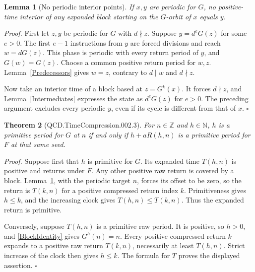 \documentclass[11pt,letterpaper]{article}
\newcommand{\N}{\mathbb{N}}
\newcommand{\Z}{\mathbb{Z}}
\newtheorem{theorem}{Theorem}
\newtheorem{lemma}[theorem]{Lemma}
\newenvironment{proof}{\noindent\textit{Proof.}}{\hfill\(\square\)}
\begin{document}
\begin{lemma}[No periodic interior points]\label{NoInterior}
If \(x,y\) are periodic for \(G\), no positive-time interior of any expanded
block starting on the \(G\)-orbit of \(x\) equals \(y\).
\end{lemma}
\begin{proof}
First let \(z,y\) be periodic for \(G\) with \(d\nmid z\).
Suppose \(y=d^eG(z)\) for some \(e>0\). The first \(e-1\) instructions
from \(y\) are forced divisions and reach \(w=dG(z)\).
This phase is periodic with every return period of \(y\), and
\(G(w)=G(z)\). Choose a common positive return period for \(w,z\).
Lemma~\ref{Predecessors} gives \(w=z\), contrary to \(d\mid w\) and
\(d\nmid z\).

Now take an interior time of a block based at \(z=G^k(x)\).
It forces \(d\nmid z\), and Lemma~\ref{Intermediates} expresses the state
as \(d^eG(z)\) for \(e>0\). The preceding argument excludes every periodic
\(y\), even if its cycle is different from that of \(x\).
\end{proof}

\begin{theorem}[QCD.TimeCompression.002.3]\label{Primitive}
For \(n\in\Z\) and \(h\in\N\), \(h\) is a primitive period for
\(G\) at \(n\) if and only if \(h+aR(h,n)\) is a primitive period for
\(F\) at that same seed.
\end{theorem}
\begin{proof}
Suppose first that \(h\) is primitive for \(G\). Its expanded time
\(T(h,n)\) is positive and returns under \(F\).
Any other positive raw return is covered by a block. Lemma~\ref{NoInterior},
with the periodic target \(n\), forces its offset to be zero, so the return is
\(T(k,n)\) for a positive compressed return index \(k\). Primitiveness gives
\(h\le k\), and the increasing clock gives \(T(h,n)\le T(k,n)\).
Thus the expanded return is primitive.

Conversely, suppose \(T(h,n)\) is a primitive raw period. It is positive, so
\(h>0\), and \eqref{BlockIdentity} gives \(G^h(n)=n\).
Every positive compressed return \(k\) expands to a positive raw return
\(T(k,n)\), necessarily at least \(T(h,n)\). Strict increase of the clock
then gives \(h\le k\). The formula for \(T\) proves the displayed assertion.
\end{proof}
\end{document}
